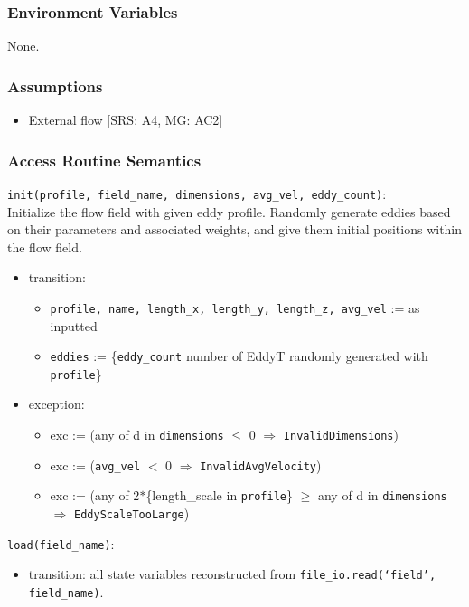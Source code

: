 \documentclass[12pt, titlepage]{article}
\begin{document}
\subsubsection{Environment Variables}
None.

\subsubsection{Assumptions}
\begin{itemize}
  \item External flow [SRS: A4, MG: AC2]
\end{itemize}

\subsubsection{Access Routine Semantics}

\noindent \texttt{init(profile, field\_name, dimensions, avg\_vel, eddy\_count)}:\\
Initialize the flow field with given eddy profile. Randomly generate eddies based on their parameters and associated weights, and give them initial positions within the flow field.
\begin{itemize}
\item transition: 
  \begin{itemize}
    \item \texttt{profile, name, length\_x, length\_y, length\_z, avg\_vel} := as inputted
    \item \texttt{eddies} := \{\texttt{eddy\_count} number of EddyT randomly generated with \texttt{profile}\}
  \end{itemize}
\item exception: 
  \begin{itemize}
    \item exc := (any of d in \texttt{dimensions} $\le$ 0 $\Rightarrow$ \texttt{InvalidDimensions})
    \item exc := (\texttt{avg\_vel} $<$ 0 $\Rightarrow$ \texttt{InvalidAvgVelocity})
    \item exc := (any of 2$*$\{length\_scale in \texttt{profile}\} $\ge$ any of d in \texttt{dimensions} $\Rightarrow$ \texttt{EddyScaleTooLarge})
  \end{itemize}
\end{itemize}

\noindent \texttt{load(field\_name)}:
\begin{itemize}
  \item transition: all state variables reconstructed from \texttt{file\_io.read(`field', field\_name)}.
\end{itemize}
\end{document}
